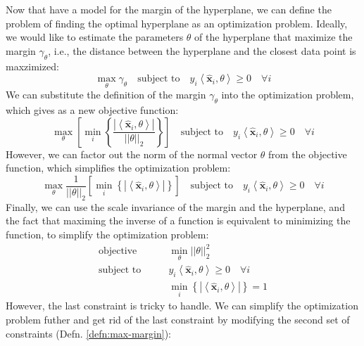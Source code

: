 \documentclass{article}[11pt]
\newcommand{\norm}[1]{\left|\left|#1\right|\right|}
\begin{document}
Now that have a model for the margin of the hyperplane, we can define the problem of finding the optimal hyperplane as an optimization problem.
Ideally, we would like to estimate the parameters $\theta$ of the hyperplane that maximize the margin $\gamma_{\theta}$, i.e., the distance between the hyperplane and the closest data point is maxzimized:
\begin{equation*}\label{eq:max-margin}
    \max_{\theta}\gamma_{\theta}\quad\text{subject to}\quad y_{i}\left<\hat{\mathbf{x}}_{i},\theta\right> \geq 0\quad\forall i
\end{equation*}
We can substitute the definition of the margin $\gamma_{\theta}$ into the optimization problem, which gives as a new objective function:
\begin{equation*}
    \max_{\theta}\left[\min_{i}\left\{\frac{|\left<\hat{\mathbf{x}}_{i},\theta\right>|}{\norm{\theta}_{2}}\right\}\right]\quad\text{subject to}\quad y_{i}\left<\hat{\mathbf{x}}_{i},\theta\right> \geq 0\quad\forall i
\end{equation*}
However, we can factor out the norm of the normal vector $\theta$ from the objective function, which simplifies the optimization problem:
\begin{equation*}
    \max_{\theta}\frac{1}{\norm{\theta}_{2}}\left[\min_{i}\left\{|\left<\hat{\mathbf{x}}_{i},\theta\right>|\right\}\right]\quad\text{subject to}\quad y_{i}\left<\hat{\mathbf{x}}_{i},\theta\right> \geq 0\quad\forall i
\end{equation*}
Finally, we can use the scale invariance of the margin and the hyperplane, and the fact that maximing the inverse of a function is equivalent to minimizing the function, 
to simplify the optimization problem:
\begin{align*}
    \text{objective}\qquad & \min_{\theta}\norm{\theta}_{2}^{2}\\
    \text{subject to}\qquad & y_{i}\left<\hat{\mathbf{x}}_{i},\theta\right> \geq 0\quad\forall i\\
    & \min_{i}\left\{|\left<\hat{\mathbf{x}}_{i},\theta\right>|\right\} = 1
\end{align*}
However, the last constraint is tricky to handle. 
We can simplify the optimization problem futher and get rid of the last constraint by modifying the second set of constraints (Defn. \ref{defn:max-margin}):
\end{document}
